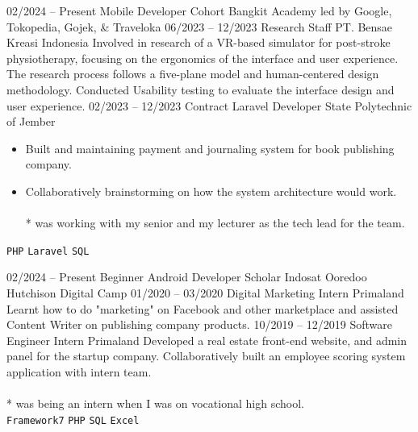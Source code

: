 \documentclass[9pt]{developercv} %
\begin{document}
\begin{entrylist}
	\entry
	{02/2024 -- Present}
	{Mobile Developer Cohort}
	{Bangkit Academy led by Google, Tokopedia, Gojek, \& Traveloka}
	{}
	\entry
	{06/2023 -- 12/2023}
	{Research Staff}
	{PT. Bensae Kreasi Indonesia}
	{Involved in research of a VR-based simulator for post-stroke physiotherapy, focusing on the ergonomics of the interface and user experience. The research process follows a five-plane model and human-centered design methodology. Conducted Usability testing to evaluate the interface design and user experience.}
	\entry
	{02/2023 -- 12/2023}
	{Contract Laravel Developer}
	{State Polytechnic of Jember}
	{\vspace{-10pt}
		\begin{itemize}[noitemsep,topsep=0pt,parsep=0pt,partopsep=0pt, leftmargin=-1pt]
			\item {Built and maintaining payment and journaling system for book publishing company.}
			\item {Collaboratively brainstorming on how the system architecture would work.}
			      \vspace{-7 pt}
			      \\ \\
			      {* was working with my senior and my lecturer as the tech lead for the team.}
		\end{itemize}
		\texttt{PHP} \slashsep \texttt{Laravel} \slashsep \texttt{SQL} }
	\entry
	{02/2024 -- Present}
	{Beginner Android Developer Scholar}
	{Indosat Ooredoo Hutchison Digital Camp}
	{}
	\entry
	{01/2020 -- 03/2020}
	{Digital Marketing Intern}
	{Primaland}
	{Learnt how to do "marketing" on Facebook and other marketplace and assisted Content Writer on publishing company products.}
	\entry
	{10/2019 -- 12/2019}
	{Software Engineer Intern}
	{Primaland}
	{{Developed a real estate front-end website, and admin panel for the startup company. Collaboratively built an employee scoring system application with intern team.}
	\vspace{-7 pt}
	\\ \\
	{* was being an intern when I was on vocational high school.}
	\\
	\texttt{Framework7} \slashsep \texttt{PHP} \slashsep \texttt{SQL} \slashsep \texttt{Excel}}
\end{entrylist}
\end{document}
